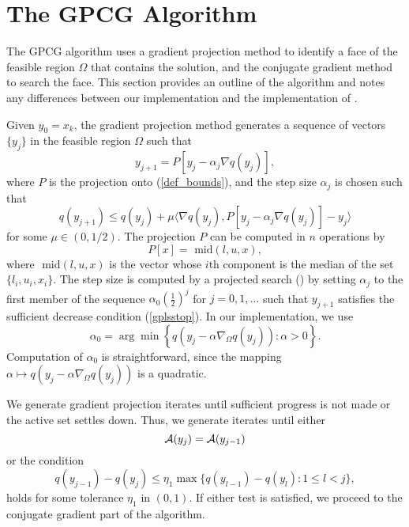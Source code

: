 \documentclass{esub2acm}
\newcommand{\Ref}[1]{\mbox{\rm{(\ref{#1})}}}
\newcommand{\half}{{\textstyle{\frac{1}{2}}}}
\begin{document}
\section{The GPCG Algorithm}

\label{alg}

The GPCG algorithm uses a gradient projection method
to identify a face of the feasible region $ \Omega $
that contains the solution, and the conjugate gradient
method to search the face.
This section provides an outline of the algorithm and notes any
differences between our implementation and the implementation
of .

Given $y_0=x_k$,
the gradient projection method generates a sequence of vectors $\{y_j\}$
in the feasible region $\Omega$ such that
\begin{equation} \label{next-y}
y_{j+1} = P [ y_j - \alpha_j \nabla q(y_j) ],  
\end{equation}
where $P$ is the projection
onto (\ref{def_bounds}), and
the step size $\alpha_j$ is chosen such that
\begin{equation}  \label{gplsstop}
 q(y_{j+1}) \leq q(y_j) + \mu
\langle \nabla q(y_j), P [ y_j - \alpha_j \nabla q(y_j) ] - y_j \rangle
\end{equation}
for some $\mu \in (0, 1/2 )$.
The projection $P$ can be computed in $n$ operations by
\[ 
P[x] = \mbox{ mid} (l,u,x), 
\]
where $\mbox{ mid} (l,u,x)$ is the vector whose $i${th} component
is the median of the set $\{ l_i, u_i, x_i \} $.
The step size is computed by a
projected search () by setting $ \alpha_j $
to the first member of the sequence
$ \alpha_0 ( \half ) ^ j $ for $ j = 0, 1, \ldots $ such that
$ y_{j+1} $ satisfies the sufficient decrease condition \Ref{gplsstop}.
In our implementation, we use
\begin{equation} \label{bqpls}
\alpha_{0}= \arg \min 
\left \{ 
q \left (y_j - \alpha  \nabla_{\Omega} q(y_j) \right ):
\alpha > 0 
\right \} .
\end{equation}
Computation of $ \alpha_0 $ is straightforward, since 
the mapping 
$ \alpha \mapsto 
q \left (y_j - \alpha  \nabla_{\Omega} q(y_j) \right ) $ is
a quadratic.

We generate gradient projection
iterates until sufficient progress is not made or
the active set settles down.
Thus, we generate iterates until either
\begin{equation} 
\label{pgstop1}
 {\cal A}(y_j) = {\cal A}(y_{j-1})
\end{equation}
or the condition
\begin{equation} 
\label{pgstop2}
 q(y_{j-1}) - q(y_j) \leq \eta_1 \max \{q(y_{l-1}) - q(y_l) : 1 \leq l < j \},
\end{equation}
holds for some tolerance $ \eta_1 $ in $ (0,1) $.
If either test is satisfied, we proceed to the
conjugate gradient part of the algorithm.
\end{document}

